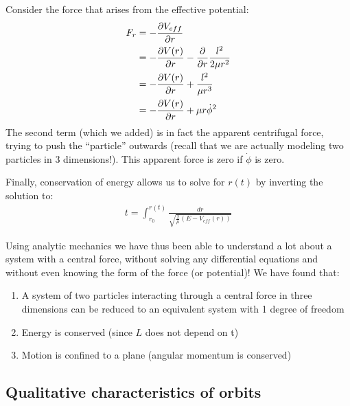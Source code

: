 Consider the force that arises from the effective potential:
\begin{align}
F_r&=-\frac{\partial V_{eff}}{\partial r}\nonumber\\
&=-\frac{\partial V(r)}{\partial r}-\frac{\partial }{\partial r}\frac{l^2}{2\mu r^2}\nonumber\\
&=-\frac{\partial V(r)}{\partial r}+\frac{l^2}{\mu r^3}\nonumber\\
&=-\frac{\partial V(r)}{\partial r}+\mu r\dot\phi^2\nonumber
\end{align}
The second term (which we added) is in fact the apparent centrifugal force, trying to push the ``particle'' outwards (recall that we are actually modeling two particles in 3 dimensions!). This apparent force is zero if $\dot\phi$ is zero.

Finally, conservation of energy allows us to solve for $r(t)$ by inverting the solution to:
\begin{align}
t=\int_{r_0}^{r(t)}\frac{dr}{\sqrt{\frac{2}{\mu}(E-V_{eff}(r))}}
\end{align}

Using analytic mechanics we have thus been able to understand a lot about a system with a central force, without solving any differential equations and without even knowing the form of the force (or potential)! We have found that:
\begin{enumerate}
\item A system of two particles interacting through a central force in three dimensions can be reduced to an equivalent system with 1 degree of freedom
\item Energy is conserved (since $L$ does not depend on t)
\item Motion is confined to a plane (angular momentum is conserved)
\end{enumerate}

\subsection{Qualitative characteristics of orbits}

